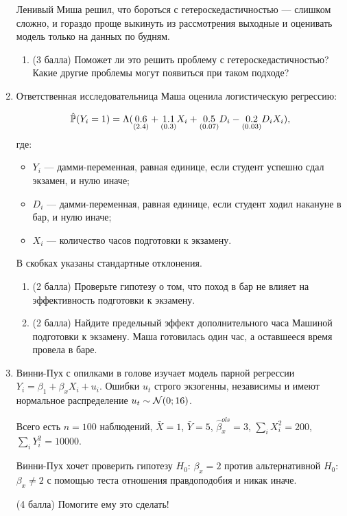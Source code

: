 \begin{enumerate}
\begin{enumerate}
\end{enumerate}

Ленивый Миша решил, что бороться с гетероскедастичностью — слишком сложно, и гораздо проще выкинуть из рассмотрения выходные и оценивать модель только на данных по будням. 

\begin{enumerate}[resume]
\item (3 балла) Поможет ли это решить проблему с гетероскедастичностью? Какие другие проблемы могут появиться при таком подходе?



\end{enumerate}



\item 
Ответственная исследовательница Маша оценила логистическую регрессию:

\[
\hat \P(Y_i = 1) = \Lambda( \underset{(2.4)}{0.6} + \underset{(0.3)}{1.1} X_i + \underset{(0.07)}{0.5} D_i - \underset{(0.03)}{0.2} D_i X_i),
\]
где:
\begin{itemize}
\item $Y_i$ — дамми-переменная, равная единице, если студент успешно сдал экзамен, и нулю иначе; 
\item $D_i$ — дамми-переменная, равная единице, если студент ходил накануне в бар, и нулю иначе;
\item $X_i$ — количество часов подготовки к экзамену. 
\end{itemize}

В скобках указаны стандартные отклонения.

\begin{enumerate} 

\item (2 балла) Проверьте гипотезу о том, что поход в бар не влияет на эффективность подготовки к экзамену.

\item (2 балла) Найдите предельный эффект дополнительного часа Машиной подготовки к экзамену. 
Маша готовилась один час, а оставшееся время провела в баре.

\end{enumerate}


\item 
Винни-Пух с опилками в голове изучает модель парной регрессии $Y_i = \beta_1 + \beta_x X_i + u_i$.
Ошибки $u_t$ строго экзогенны, независимы и имеют нормальное распределение $u_t \sim \cN(0;16)$.

Всего есть $n=100$ наблюдений, $\bar X = 1$, $\bar Y= 5$, $\hat \beta_x^{ols} = 3$, $\sum_i X_i^2=200$, $\sum_i Y_i^2=10000$.


Винни-Пух хочет проверить гипотезу $H_0$: $\beta_x = 2$ против альтернативной $H_0$: $\beta_x \neq 2$ с помощью теста отношения правдоподобия и никак иначе. 


(4 балла) Помогите ему это сделать!


\end{enumerate}



